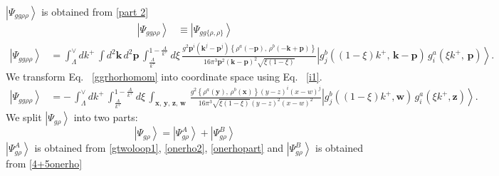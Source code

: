 \documentclass[aps,prd,amsmath,amssymb,nofootinbib]{revtex4-2}
\numberwithin{equation}{section}
\begin{document}
$\left|\Psi_{gg\rho\rho}\right\rangle$ is obtained from \eqref{part 2}
\begin{align}
    \left|\Psi_{gg\rho\rho}\right\rangle & \equiv \left|\Psi_{gg\{\rho,\rho\}}\right\rangle
\end{align}
\begin{align}\label{ggrhorhomom}
\left|\Psi_{gg\rho\rho}\right\rangle & = \int_{\Lambda}^{\vee}dk^{+}\,\int d^{2}\mathbf{k}\, d^{2}\mathbf{p}\,\int_{\frac{\Lambda}{k^{+}}}^{1-\frac{\Lambda}{k^{+}}}d\xi\,\frac{g^{2}\mathbf{p}^{i}\left(\mathbf{k}^{j}-\mathbf{p}^{j}\right)\left\{ \rho^{a}(-\mathbf{p}),\,\rho^{b}(-\mathbf{k}+\mathbf{p})\right\} }{16\pi^{3}\mathbf{p}^{2}(\mathbf{k}-\mathbf{p})^{2}\sqrt{\xi(1-\xi)}}  \left|g_{j}^{b}((1-\xi)k^{+},\,\mathbf{k}-\mathbf{p})\,g_{i}^{a}(\xi k^{+},\,\mathbf{p})\right\rangle.
\end{align}
We transform Eq.~ \eqref{ggrhorhomom} into coordinate space using Eq.~ \eqref{i1}. 
\begin{align} \label{ggrhorhopos}
    \left|\Psi_{gg\rho\rho}\right\rangle & =  -\,\int_{\Lambda}^{\vee}dk^{+}\,\int_{\frac{\Lambda}{k^{+}}}^{1-\frac{\Lambda}{k^{+}}}d\xi\,\int_{\mathbf{x},\,\mathbf{y},\,\mathbf{z},\,\mathbf{w}}\,\frac{g^{2}\left\{ \rho^{a}(\mathbf{y}),\,\rho^{b}(\mathbf{x})\right\} (y-z)^{i}(x-w)^{j}}{16\pi^{3}\sqrt{\xi(1-\xi)}(y-z)^{2}(x-w)^{2}}\left|g_{j}^{b}((1-\xi)k^{+},\mathbf{w})\, g_{i}^{a}(\xi k^{+},\mathbf{z})\right\rangle .
\end{align}
We split $\left|\Psi_{g\rho}\right\rangle$ into two parts: 
$$\left|\Psi_{g\rho}\right\rangle = \left|\Psi^{A}_{g\rho}\right\rangle + \left|\Psi^{B}_{g\rho}\right\rangle $$
$\left|\Psi^{A}_{g\rho}\right\rangle$ is obtained from \eqref{gtwoloop1}, \eqref{onerho2}, \eqref{onerhopart} and $\left|\Psi^{B}_{g\rho}\right\rangle$ is obtained from \eqref{4+5onerho} 
\end{document}
